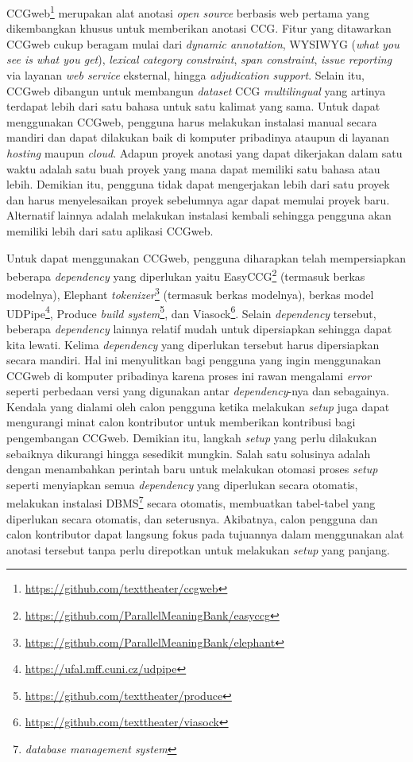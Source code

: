 CCGweb\footnote{\url{https://github.com/texttheater/ccgweb}} merupakan alat anotasi
\textit{open source} berbasis web pertama yang dikembangkan khusus untuk memberikan anotasi
CCG\citep{evang-etal-2019-ccgweb}. Fitur yang ditawarkan CCGweb cukup beragam mulai dari
\textit{dynamic annotation}, WYSIWYG (\textit{what you see is what you get}),
\textit{lexical category constraint}, \textit{span constraint}, \textit{issue reporting} via
layanan \textit{web service} eksternal, hingga \textit{adjudication support}. Selain itu, CCGweb
dibangun untuk membangun \textit{dataset} CCG \textit{multilingual} yang artinya terdapat lebih
dari satu bahasa untuk satu kalimat yang sama. Untuk dapat menggunakan CCGweb, pengguna harus
melakukan instalasi manual secara mandiri dan dapat dilakukan baik di komputer pribadinya ataupun
di layanan \textit{hosting} maupun \textit{cloud}. Adapun proyek anotasi yang dapat dikerjakan
dalam satu waktu adalah satu buah proyek yang mana dapat memiliki satu bahasa atau lebih.
Demikian itu, pengguna tidak dapat mengerjakan lebih dari satu proyek dan harus menyelesaikan
proyek sebelumnya agar dapat memulai proyek baru. Alternatif lainnya adalah melakukan instalasi
kembali sehingga pengguna akan memiliki lebih dari satu aplikasi CCGweb.

Untuk dapat menggunakan CCGweb, pengguna diharapkan telah mempersiapkan beberapa
\textit{dependency} yang diperlukan yaitu
EasyCCG\footnote{\url{https://github.com/ParallelMeaningBank/easyccg}} (termasuk berkas modelnya),
Elephant \textit{tokenizer}\footnote{\url{https://github.com/ParallelMeaningBank/elephant}}
(termasuk berkas modelnya), berkas model UDPipe\footnote{\url{https://ufal.mff.cuni.cz/udpipe}},
Produce \textit{build system}\footnote{\url{https://github.com/texttheater/produce}}, dan
Viasock\footnote{\url{https://github.com/texttheater/viasock}}. Selain \textit{dependency} tersebut,
beberapa \textit{dependency} lainnya relatif mudah untuk dipersiapkan sehingga dapat kita lewati.
Kelima \textit{dependency} yang diperlukan tersebut harus dipersiapkan secara mandiri. Hal ini
menyulitkan bagi pengguna yang ingin menggunakan CCGweb di komputer pribadinya karena proses ini
rawan mengalami \textit{error} seperti perbedaan versi yang digunakan antar \textit{dependency}-nya
dan sebagainya. Kendala yang dialami oleh calon pengguna ketika melakukan \textit{setup} juga dapat
mengurangi minat calon kontributor untuk memberikan kontribusi bagi pengembangan CCGweb. Demikian
itu, langkah \textit{setup} yang perlu dilakukan sebaiknya dikurangi hingga sesedikit mungkin.
Salah satu solusinya adalah dengan menambahkan perintah baru untuk melakukan otomasi proses
\textit{setup} seperti menyiapkan semua \textit{dependency} yang diperlukan secara otomatis,
melakukan instalasi DBMS\footnote{\textit{database management system}} secara otomatis, membuatkan
tabel-tabel yang diperlukan secara otomatis, dan seterusnya. Akibatnya, calon pengguna dan calon
kontributor dapat langsung fokus pada tujuannya dalam menggunakan alat anotasi tersebut tanpa perlu
direpotkan untuk melakukan \textit{setup} yang panjang.

